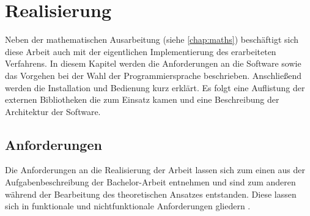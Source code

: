 \chapter{Realisierung}
\label{chap:impl}
Neben der mathematischen Ausarbeitung (siehe \autoref{chap:maths}) beschäftigt sich diese Arbeit auch mit der eigentlichen Implementierung des erarbeiteten Verfahrens. In diesem Kapitel werden die Anforderungen an die Software sowie das Vorgehen bei der Wahl der Programmiersprache beschrieben. Anschließend werden die Installation und Bedienung kurz erklärt. Es folgt eine Auflistung der externen Bibliotheken die zum Einsatz kamen und eine Beschreibung der Architektur der Software.

\section{Anforderungen}
Die Anforderungen an die Realisierung der Arbeit lassen sich zum einen aus der Aufgabenbeschreibung der Bachelor-Arbeit entnehmen und sind zum anderen während der Bearbeitung des theoretischen Ansatzes entstanden. Diese lassen sich in funktionale und nichtfunktionale Anforderungen gliedern  \cite[S. 369f]{ludewig}.
